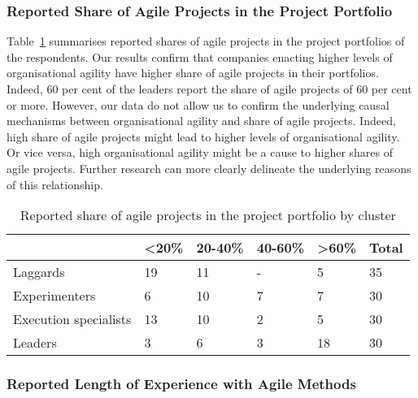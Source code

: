 \documentclass{article}
\begin{document}
\subsubsection{Reported Share of Agile Projects in the Project Portfolio}


Table~\ref{tab:agile-projects} summarises reported shares of agile projects in the project portfolios of the respondents.
Our results confirm that companies enacting higher levels of organisational agility have higher share of agile projects in their portfolios. Indeed, 60 per cent of the leaders report the share of agile projects of 60 per cent or more. However, our data do not allow us to confirm the underlying causal mechanisms between organisational agility and share of agile projects. Indeed, high share of agile projects might lead to higher levels of organisational agility. Or vice versa, high organisational agility might be a cause to higher shares of agile projects. Further research can more clearly delineate the underlying reasons of this relationship.
%
\begin{table}[hbt]
 \small
 \caption{Reported share of agile projects in the project portfolio by cluster}
  \centering
  \begin{tabular}{llllll}
     & <20\% & 20-40\% & 40-60\% & >60\% & Total \\
    \midrule
    Laggards & 19 & 11 & - & 5 & 35 \\
    Experimenters & 6 & 10 & 7 & 7 & 30 \\
    Execution specialists & 13 & 10 & 2 & 5 & 30 \\
    Leaders & 3 & 6 & 3 & 18 & 30 \\
    \midrule
  \end{tabular}
  \label{tab:agile-projects}
 \end{table}


\subsubsection{Reported Length of Experience with Agile Methods}

\end{document}
